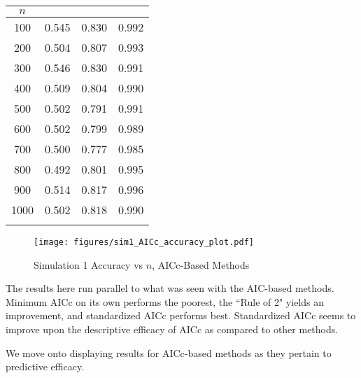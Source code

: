 		\begin{table}[H]
			\centering
			\small\addtolength{\tabcolsep}{-3pt}
			\setlength\extrarowheight{-3pt}
			{
			\begin{tabular}{ c|c|c|c}
			$n$ & \vtop{\hbox{\strut Minimum AICc}\hbox{\strut Accuracy}} & \vtop{\hbox{\strut AICc Rule of 2}\hbox{\strut Accuracy}} & \vtop{\hbox{\strut Standardized AICc}\hbox{\strut Accuracy}} \\
			 \hline
			 100 & 0.545  &  0.830 &  0.992 \\
			 200 & 0.504  &  0.807 &  0.993 \\
			 300 & 0.546  &  0.830 &  0.991 \\
			 400 & 0.509  &  0.804 &  0.990 \\
			 500 & 0.502  &  0.791 &  0.991 \\
			 600 & 0.502  &  0.799 &  0.989 \\
			 700 & 0.500  &  0.777 &  0.985 \\
			 800 & 0.492  &  0.801 &  0.995 \\
			 900 & 0.514  &  0.817 &  0.996 \\
			 1000 &  0.502  &  0.818 &  0.990 \\
			 \Xhline{3\arrayrulewidth}
			\end{tabular}
			}
		\end{table}

		\begin{figure}[H]
			\centering
			\captionsetup{justification=centering}
			\texttt{[image: figures/sim1\_AICc\_accuracy\_plot.pdf]}
			\caption{\label{fig:sim1_aicc_accuracy_plot} Simulation 1 Accuracy vs $n$, AICc-Based Methods}
		\end{figure}

		The results here run parallel to what was seen with the AIC-based methods. Minimum AICc on its own performs the poorest, the ``Rule of 2" yields an improvement, and standardized
		AICc performs best. Standardized AICc seems to improve upon the descriptive efficacy of AICc as compared to other methods.
		
		We move onto displaying results for AICc-based methods as they pertain to predictive efficacy. 

